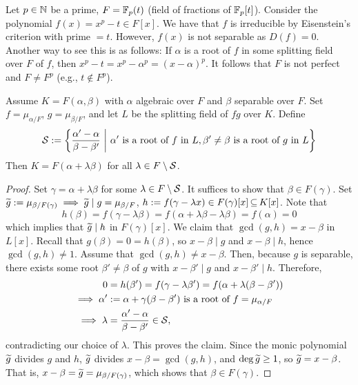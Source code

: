 \documentclass[11pt]{book}
\theoremstyle{definition}   \newtheorem{defn}[counter]{Definition} %
\newcommand{\bs}{\setminus}   \newcommand{\A}{\mathcal{A}}   \newcommand{\sy}{\textnormal{Syl}}   \newcommand{\size}[1]{\left| #1 \right|}
\newcommand{\vs}{\vspace{8pt}}
\numberwithin{counter}{chapter}
\begin{document}
\vs

\begin{example}
Let $p \in \operatorname{\mathbb{N}}$ be a prime, $F = \mathbb{F}_p(t)$ (field of fractions of $\mathbb{F}_p[t]$). Consider the polynomial $f(x) = x^p-t \in F[x]$. We have that $f$ is irreducible by Eisenstein's criterion with prime $= t$. However, $f(x)$ is not separable as $D(f) = 0$. Another way to see this is as follows: If $\alpha$ is a root of $f$ in some splitting field over $F$ of $f$, then $x^p-t = x^p-\alpha^p = (x-\alpha)^p$. It follows that $F$ is not perfect and $F \ne F^p$ (e.g., $t \notin F^p$). 
\end{example}

\vs

\begin{lemma}
Assume $K = F(\alpha,\beta)$ with $\alpha$ algebraic over $F$ and $\beta$ separable over $F$. Set $f = \mu_{\alpha/F}$, $g = \mu_{\beta/F}$, and let $L$ be the splitting field of $fg$ over $K$. Define
	\[\mathcal{S} := \left\{ \frac{\alpha'-\alpha}{\beta - \beta'} \ \bigg | \ \alpha' \textnormal{ is a root of } f \textnormal{ in } L, \beta' \ne \beta \textnormal{ is a root of } g \textnormal{ in } L \right\} \]
Then $K = F(\alpha + \lambda \beta)$ for all $\lambda \in F \bs \mc{S}$. 
\end{lemma}

\begin{proof}
Set $\gamma = \alpha + \lambda \beta$ for some $\lambda \in F \bs \mc{S}$. It suffices to show that $\beta \in F(\gamma)$. Set $\widetilde{g} := \mu_{\beta/F(\gamma)} \implies \widetilde{g} \mid g = \mu_{\beta/F}$, $h := f(\gamma - \lambda x) \in F(\gamma)[x] \operatorname{\subseteq} K[x]$. Note that 
	\[h(\beta) = f(\gamma - \lambda \beta) = f(\alpha + \lambda \beta - \lambda \beta) = f(\alpha) = 0 \]
which implies that $\widetilde{g} \mid h$ in $F(\gamma)[x]$. We claim that $\gcd(g,h) = x-\beta$ in $L[x]$. Recall that $g(\beta) = 0 = h(\beta)$, so $x - \beta \mid g$ and $x-\beta \mid h$, hence $\gcd(g,h) \ne 1$. Assume that $\gcd(g,h) \ne x-\beta$. Then, because $g$ is separable, there exists some root $\beta' \ne \beta$ of $g$ with $x-\beta' \mid g$ and $x-\beta' \mid h$. Therefore,
\begin{align*}
0 &= h(\beta') = f(\gamma-\lambda \beta') = f(\alpha + \lambda(\beta-\beta')) \\
\implies \alpha' &:= \alpha + \gamma(\beta - \beta') \textnormal{ is a root of } f = \mu_{\alpha/F} \\
\implies \lambda &= \frac{\alpha'-\alpha}{\beta - \beta'} \in \mathcal{S},
\end{align*}
contradicting our choice of $\lambda$. This proves the claim. Since the monic polynomial $\widetilde{g}$ divides $g$ and $h$, $\widetilde{g}$ divides $x-\beta = \gcd(g,h)$, and $\deg \widetilde{g} \geq 1$, so $\widetilde{g} = x-\beta$. That is, $x-\beta = \widetilde{g} = \mu_{\beta/F(\gamma)}$, which shows that $\beta \in F(\gamma)$. 
\end{proof}
\end{document}
